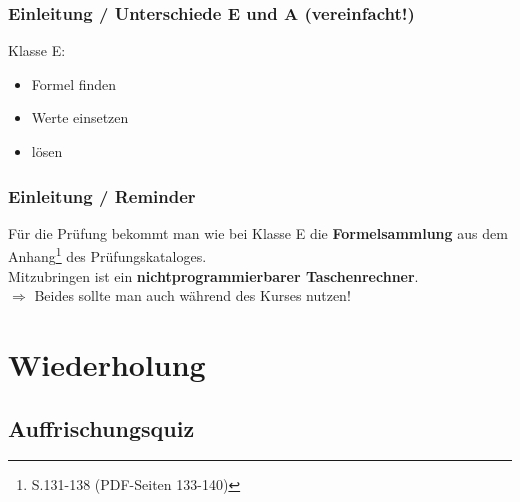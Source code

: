 \begin{frame}
    \frametitle{Einleitung / Unterschiede E und A (vereinfacht!)}

    \vspace{1em}
    Klasse E:

    \begin{itemize}
        \item Formel finden
        \item Werte einsetzen
        \item lösen
    \end{itemize}



\end{frame}

\begin{frame}
    \frametitle{Einleitung / Reminder}

    Für die Prüfung bekommt man wie bei Klasse E die
    \textbf{Formelsammlung}\hyperlink{refs}{\cite{mat}} aus dem
    Anhang\footnote{S.131-138 (PDF-Seiten 133-140)} des Prüfungskataloges.\\[1em]
    
    Mitzubringen ist ein \textbf{nichtprogrammierbarer Taschenrechner}. \\[3em]

    $\Rightarrow$ Beides sollte man auch während des Kurses nutzen!

\end{frame}

\section{Wiederholung}

\subsection{Auffrischungsquiz}

